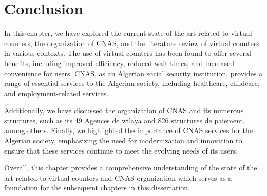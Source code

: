 \section{Conclusion}
In this chapter, we have explored the current state of the art related to virtual counters, the organization of CNAS, and the literature review of virtual counters in various contexts. The use of virtual counters has been found to offer several benefits, including improved efficiency, reduced wait times, and increased convenience for users. CNAS, as an Algerian social security institution, provides a range of essential services to the Algerian society, including healthcare, childcare, and employment-related services.

Additionally, we have discussed the organization of CNAS and its numerous structures, such as its 49 Agences de wilaya and 826 structures de paiement, among others. Finally, we highlighted the importance of CNAS services for the Algerian society, emphasizing the need for modernization and innovation to ensure that these services continue to meet the evolving needs of its users.

Overall, this chapter provides a comprehensive understanding of the state of the art related to virtual counters and CNAS organization which serves as a foundation for the subsequent chapters in this dissertation.

